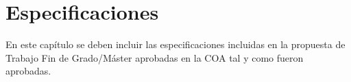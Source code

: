
\chapter*{Especificaciones}
En este capítulo se deben incluir las especificaciones incluidas en la propuesta de Trabajo Fin de Grado/Máster aprobadas en la COA tal y como fueron aprobadas.
	

